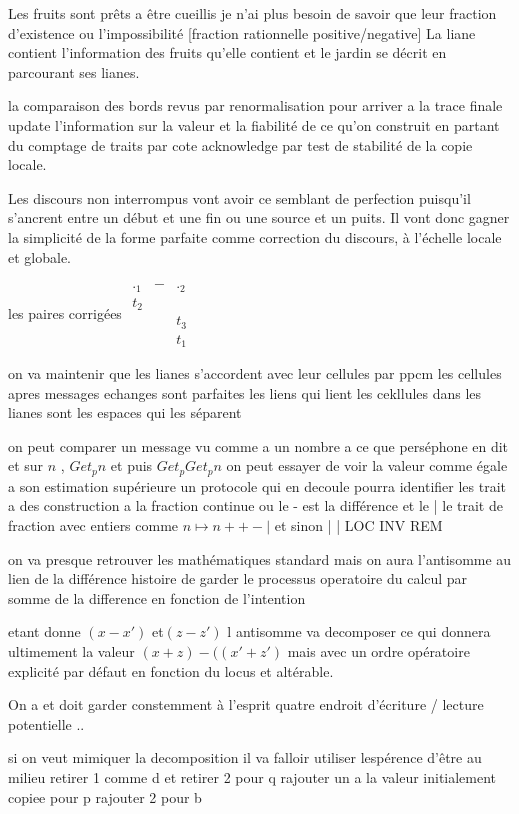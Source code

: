 \documentclass{article}
\begin{document}
Les fruits sont prêts a être cueillis je n'ai plus besoin de savoir que leur fraction d'existence ou l'impossibilité [fraction rationnelle positive/negative]
La liane contient l'information des fruits qu'elle contient et le jardin se décrit en parcourant ses lianes.
 
 la comparaison des bords revus par renormalisation pour arriver a la trace finale update l'information sur la valeur et la fiabilité  de ce qu'on construit en partant du comptage de traits par cote acknowledge par test de stabilité de la copie locale.
 
Les  discours non interrompus vont avoir ce semblant de perfection puisqu'il s'ancrent entre un début et une fin ou une source et un puits.
Il vont donc gagner la simplicité de la forme parfaite comme correction du discours, à l'échelle locale et globale.

les paires corrigées $\begin{matrix} ._1&-&._2\\ t_2&&\\&&t_3\\&&t_1\end{matrix} $

on va maintenir que les lianes s'accordent avec leur cellules par ppcm les cellules apres messages echanges sont parfaites les liens qui lient les cekllules dans les lianes  sont les espaces qui les séparent

on peut comparer un message vu comme a un nombre a ce que perséphone en dit 
et sur  $n$ , $Get_p n$  et puis   $Get_p  Get_p  n$ on peut essayer de voir la valeur comme égale a son estimation supérieure 
un protocole qui en decoule pourra identifier les trait a des construction a la fraction continue ou le - est la différence et le | le trait de fraction
avec entiers comme  $n\mapsto n++-|$ et sinon | | LOC INV REM


on va presque retrouver les mathématiques standard mais on aura l'antisomme au lien de la différence
histoire de garder le processus operatoire du calcul par somme de la difference en fonction de l'intention

etant donne $(x-x')$ et$ (z-z')$  
l antisomme va decomposer ce qui donnera ultimement la valeur $(x+z) -( (x'+z')$ mais avec un ordre opératoire explicité par défaut en fonction du locus et altérable.

On a  et doit garder constemment à l'esprit quatre endroit d'écriture / lecture potentielle ..

si on veut mimiquer la decomposition il va falloir utiliser lespérence d'être au milieu retirer 1 comme d et retirer 2 pour q  rajouter un a la valeur initialement copiee  pour p rajouter 2 pour b
\end{document}

